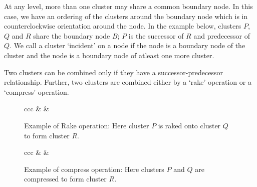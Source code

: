 \documentclass[a4paper,12pt]{article}
\begin{document}
At any level, more than one cluster may share a common boundary node. In this case, we have an ordering of the clusters around the boundary node which is in counterclockwise orientation around the node. In the example below, clusters $P$, $Q$ and $R$ share the boundary node $B$; $P$ is the successor of $R$ and predecessor of $Q$. We call a cluster `incident' on a node if the node is a boundary node of the cluster and the node is a boundary node of atleast one more cluster.

Two clusters can be combined only if they have a successor-predecessor relationship. Further, two clusters are combined either by a `rake' operation or a `compress' operation.
\begin{figure}
\begin{tabular}{ccc}
&
&
\end{tabular}
\caption{Example of Rake operation: Here cluster $P$ is raked onto cluster $Q$ to form cluster $R$.}
\label{fig:rake-example}
\end{figure}
\begin{figure}
\begin{tabular}{ccc}
&
&
\end{tabular}
\caption{Example of compress operation: Here clusters $P$ and $Q$ are compressed to form cluster $R$.}
\label{fig:compress-example}
\end{figure}
\end{document}
